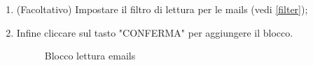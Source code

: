 \begin{enumerate}
\begin{enumerate}
	\end{enumerate}
	\item (Facoltativo) Impostare il filtro di lettura per le mails (vedi \ref{filter});
	\item Infine cliccare sul tasto "CONFERMA" per aggiungere il blocco.
	\begin{figure}[!ht]
		\centering
		\caption{Blocco lettura emails}
	\end{figure}
\end{enumerate}
\newpage
